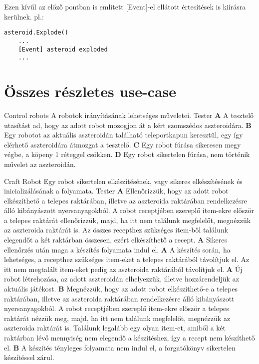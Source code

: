 \documentclass[../../projlab]{subfiles}
\begin{document}
Ezen kívűl az előző pontban is említett [Event]-el ellátott értesítések is kiírásra kerülnek.
pl.:
\begin{verbatim}
asteroid.Explode()
	...
	[Event] asteroid exploded
	...
\end{verbatim}



\section{Összes részletes use-case}
\begin{use-case}
    {Control robots}
    {A robotok irányításának lehetséges műveletei. }
    {Tester} 
    \textbf{A} A tesztelő utasítást ad, hogy az adott robot mozogjon át a kért szomszédos aszteroidára.\newline
    \textbf{B} Egy robotot az aktuális aszteroidán található teleportkapun keresztül, egy így elérhető aszteroidára átmozgat a tesztelő. \newline
    \textbf{C} Egy robot fúrása sikeresen megy végbe, a köpeny 1 réteggel csökken. \newline
    \textbf{D} Egy robot sikertelen fúrása, nem történik művelet az aszteroidán. \newline

\end{use-case}

\begin{use-case}
    {Craft Robot}
    {Egy robot sikertelen elkészítésének, vagy sikeres elkészítésének és inicializálásának a folyamata. }
    {Tester} 
    \textbf{A} Ellenőrizzük, hogy az adott robot elkészíthető a telepes raktárában, illetve az aszteroida raktárában rendelkezésre álló kibányászott nyersanyagokból. A robot receptjében szereplő item-ekre először a telepes raktárát ellenőrizzük, majd, ha itt nem találunk megfelelőt, megnézzük az aszteroida raktárát is. Az összes recepthez szükséges item-ből találunk elegendőt a két raktárban összesen, ezért elkészíthető a recept.  \newline
    \textbf{A} Sikeres ellenőrzés után maga a készítés folyamata indul el.  \newline
    \textbf{A} A készítés során, ha lehetséges, a recepthez szükséges item-eket a telepes raktárából távolítjuk el. Az itt nem megtalált item-eket pedig az aszteroida raktárából távolítjuk el.  \newline
    \textbf{A} Új robot létrehozása, az adott aszteroidán elhelyezzük, illetve hozzárendeljük az aktuális játékost.  \newline
    \textbf{B} Megnézzük, hogy az adott robot elkészíthető-e a telepes raktárában, illetve az aszteroida raktárában rendelkezésre álló kibányászott nyersanyagokból. A robot receptjében szereplő item-ekre először a telepes raktárát nézzük meg, majd, ha itt nem találunk megfelelőt, megnézzük az aszteroida raktárát is. Találunk legalább egy olyan item-et, amiből a két raktárban lévő mennyiség nem elegendő a készítéshez, így a recept nem készíthető el.  \newline
    \textbf{B} A készítés tényleges folyamata nem indul el, a forgatókönyv sikertelen készítéssel zárul. \newline
\end{use-case}
\end{document}
